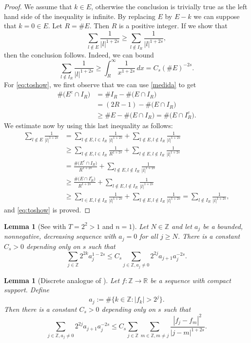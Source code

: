 \documentclass[a4paper,11pt,reqno]{amsart}
\newcommand{\R}{\mathbb{R}}
\newcommand{\Z}{\mathbb{Z}}
\newtheorem{lem}[thm]{Lemma}
\theoremstyle{definition}
\numberwithin{equation}{section}
\begin{document}
\begin{proof}
We assume that $k\in E$, otherwise the conclusion is trivially true
as the left hand side of the inequality is infinite.
By replacing $E$ by $E-k$ we can suppose that $k=0\in E$.
Let $R=\#E$. Then $R$ is a positive integer. If we show that
\begin{equation}
\label{eq:toshow}
\sum_{l\notin E}\frac{1}{|l|^{1+2s}}\geq
\sum_{l\notin I_R}\frac{1}{|l|^{1+2s}},
\end{equation}
then the conclusion follows. Indeed, we can bound
$$
\sum_{l\notin I_R}\frac{1}{|l|^{1+2s}}
\geq \int_R^\infty\frac{1}{x^{1+2s}}\,dx=C_s(\#E)^{-2s}.
$$
For \eqref{eq:toshow}, we first observe that we can use \eqref{medida} to get
\begin{align*}
\#\big(E^c\cap I_R\big) &= \#I_R-\#\big(E\cap I_R\big) \\
&= (2R-1)-\#\big(E\cap I_R\big) \\
&\geq\#E-\#\big(E\cap I_R\big)=\#\big(E\cap I_R^c\big).
\end{align*}
We estimate now by using this last inequality as follows:
\begin{align*}
\sum_{l\notin E}\frac{1}{|l|^{1+2s}} &=
\sum_{l\notin E,l\in I_R}\frac{1}{|l|^{1+2s}}+\sum_{l\notin E,l\notin I_R}\frac{1}{|l|^{1+2s}} \\
&\geq \sum_{l\notin E,l\in I_R}\frac{1}{R^{1+2s}}+
\sum_{l\notin E,l\notin I_R}\frac{1}{|l|^{1+2s}} \\
&= \frac{\#\big(E^c\cap I_R\big)}{R^{1+2s}}+\sum_{l\notin E,l\notin I_R}\frac{1}{|l|^{1+2s}} \\
&\geq \frac{\#\big(E\cap I_R^c\big)}{R^{1+2s}}+
\sum_{l\notin E,l\notin I_R}\frac{1}{|l|^{1+2s}} \\
&\geq \sum_{l\in E,l\notin I_R}\frac{1}{|l|^{1+2s}}
+\sum_{l\notin E,l\notin I_R}\frac{1}{|l|^{1+2s}}= \sum_{l\notin I_R}\frac{1}{|l|^{1+2s}},
\end{align*}
and \eqref{eq:toshow} is proved.
\end{proof}

\begin{lem}[{See \cite[Lemma~5]{Savin-Valdinoci-1} with $T=2^2>1$ and $n=1$}]\label{lem:2}
Let $N\in\Z$ and let $a_j$ be a bounded, nonnegative, decreasing sequence with $a_j=0$
for all $j\geq N$. There is a constant $C_s>0$ depending only on $s$ such that
$$
\sum_{j\in\Z}2^{2k}a_j^{1-2s}\leq C_s\sum_{j\in\Z,a_j\neq0}2^{2j}a_{j+1}a_j^{-2s}.
$$
\end{lem}

\begin{lem}[{Discrete analogue of \cite[Lemma~6]{Savin-Valdinoci-1}}]
\label{lem:3}
Let $f:\Z\to\R$ be a sequence with compact support. Define
\begin{equation}
\label{eq:ak}
a_j:=\#\{k\in\Z:|f_k|>2^j\}.
\end{equation}
Then there is a constant $C_s>0$ depending only on $s$ such that
$$
\sum_{j\in\Z,a_j\neq0}2^{2j}a_{j+1}a_j^{-2s} \leq
C_s\sum_{j\in\Z}\sum_{m\in\Z,m\neq j}\frac{|f_j-f_m|^2}{|j-m|^{1+2s}}.
$$
\end{lem}
\end{document}

